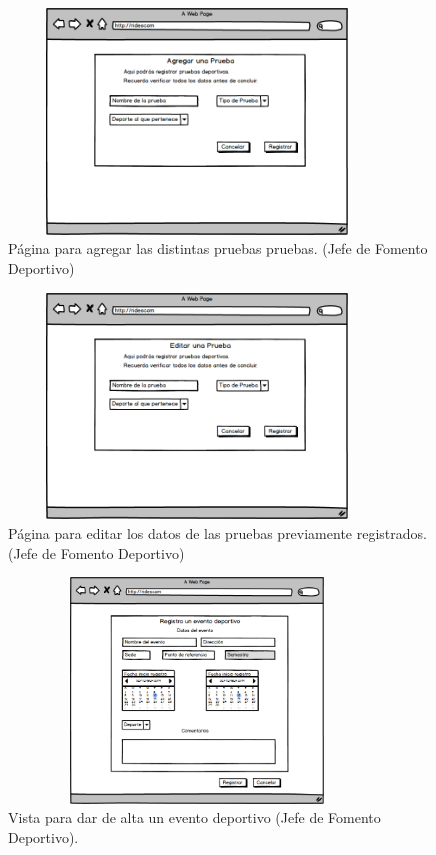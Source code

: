 		\begin{figure} [hbt!]
			\centering
			\includegraphics[width=10cm, height=6cm]{Imagenes/Nuevos/P26_AgregarPruebas_JFD}
			\caption{Página para agregar las distintas pruebas pruebas. (Jefe de Fomento Deportivo)}
			\label{agregarpruebas}
		\end{figure}
		
		\begin{figure} [hbt!]
			\centering
			\includegraphics[width=10cm, height=6cm]{Imagenes/Nuevos/P26_EditarPruebas_JFD}
			\caption{Página para editar los datos de las pruebas previamente registrados. (Jefe de Fomento Deportivo)}
			\label{editarpruebas}
		\end{figure}
	
		\begin{figure} [hbt!]
			\centering
			\includegraphics[width=10cm, height=6cm]{Imagenes/Nuevos/P4_Crear_evento_deportivo}
			\caption{Vista para dar de alta un evento deportivo (Jefe de Fomento Deportivo).}
			\label{creaevento}
		\end{figure}
		\pagebreak	
		
